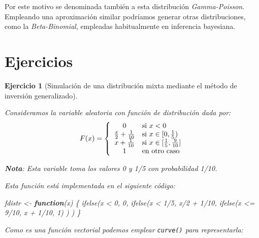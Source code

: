 \documentclass[
]{book}
\newenvironment{Shaded}{\begin{snugshade}}{\end{snugshade}}
\newcommand{\ControlFlowTok}[1]{\textcolor[rgb]{0.13,0.29,0.53}{\textbf{#1}}}
\newcommand{\DecValTok}[1]{\textcolor[rgb]{0.00,0.00,0.81}{#1}}
\newcommand{\FunctionTok}[1]{\textcolor[rgb]{0.00,0.00,0.00}{#1}}
\newcommand{\NormalTok}[1]{#1}
\newcommand{\OtherTok}[1]{\textcolor[rgb]{0.56,0.35,0.01}{#1}}
\newcommand{\SpecialCharTok}[1]{\textcolor[rgb]{0.00,0.00,0.00}{#1}}
\theoremstyle{break}
\newtheorem{exercise}{Ejercicio}[chapter]
\theoremstyle{nonumberplain}
\begin{document}
Por este motivo se denominada también a esta distribución \emph{Gamma-Poisson}. Empleando una aproximación similar podríamos generar otras distribuciones, como la \emph{Beta-Binomial}, empleadas habitualmente en inferencia bayesiana.

\hypertarget{ejercicios-discretas}{%
\section{Ejercicios}\label{ejercicios-discretas}}

\begin{exercise}[Simulación de una distribución mixta mediante el método de inversión generalizado]
\protect\hypertarget{exr:mixta-cuantil}{}\label{exr:mixta-cuantil}

Consideramos la variable aleatoria con función de distribución dada por:
\[F(x)=\left\{
\begin{array}
[c]{cl}0 & \mbox{si $x<0$}\\
\frac{x}{2}+\frac{1}{10} & \mbox{si $x\in[0,\frac{1}{5})$}\\
x+\frac{1}{10} & \mbox{si $x\in[\frac{1}{5},\frac{9}{10}]$}\\
1 & \mbox{en otro caso}
\end{array}
\right.\]

\textbf{Nota}: Esta variable toma los valores 0 y 1/5 con probabilidad 1/10.

Esta función está implementada en el siguiente código:

\begin{Shaded}
\begin{Highlighting}[]
\NormalTok{fdistr }\OtherTok{\textless{}{-}} \ControlFlowTok{function}\NormalTok{(x) \{}
\FunctionTok{ifelse}\NormalTok{(x }\SpecialCharTok{\textless{}} \DecValTok{0}\NormalTok{, }\DecValTok{0}\NormalTok{,}
    \FunctionTok{ifelse}\NormalTok{(x }\SpecialCharTok{\textless{}} \DecValTok{1}\SpecialCharTok{/}\DecValTok{5}\NormalTok{, x}\SpecialCharTok{/}\DecValTok{2} \SpecialCharTok{+} \DecValTok{1}\SpecialCharTok{/}\DecValTok{10}\NormalTok{,}
        \FunctionTok{ifelse}\NormalTok{(x }\SpecialCharTok{\textless{}=} \DecValTok{9}\SpecialCharTok{/}\DecValTok{10}\NormalTok{, x }\SpecialCharTok{+} \DecValTok{1}\SpecialCharTok{/}\DecValTok{10}\NormalTok{, }\DecValTok{1}\NormalTok{) ) )}
\NormalTok{\}}
\end{Highlighting}
\end{Shaded}

Como es una función vectorial podemos emplear \texttt{curve()} para representarla:


\end{exercise}
\end{document}
